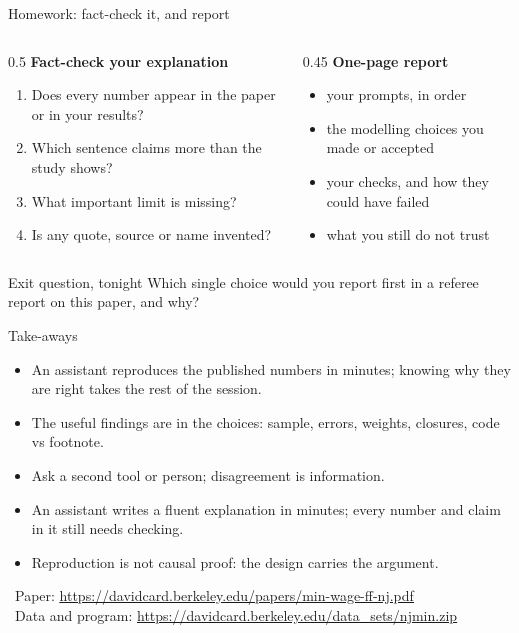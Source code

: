 \documentclass[aspectratio=169,11pt]{beamer}
\let\oldurl\url
\renewcommand{\url}[1]{{\color{linkblue}\uline{\oldurl{#1}}}}
\newcommand{\paperurl}{https://davidcard.berkeley.edu/papers/min-wage-ff-nj.pdf}
\newcommand{\dataurl}{https://davidcard.berkeley.edu/data_sets/njmin.zip}
\begin{document}
\begin{frame}{Homework: fact-check it, and report}
\begin{columns}[T]
\begin{column}{0.5\textwidth}
\textbf{Fact-check your explanation}
\begin{enumerate}
\item Does every number appear in the paper or in your results?
\item Which sentence claims more than the study shows?
\item What important limit is missing?
\item Is any quote, source or name invented?
\end{enumerate}
\end{column}
\begin{column}{0.45\textwidth}
\textbf{One-page report}
\begin{itemize}
\item your prompts, in order
\item the modelling choices you made or accepted
\item your checks, and how they could have failed
\item what you still do not trust
\end{itemize}
\end{column}
\end{columns}
\vspace{0.6em}
\begin{alertblock}{Exit question, tonight}
Which single choice would you report first in a referee report on this paper, and why?
\end{alertblock}
\end{frame}

\begin{frame}{Take-aways}
\begin{itemize}
\item An assistant reproduces the published numbers in minutes; \alert{knowing why they are right} takes the rest of the session.
\item The useful findings are in the \alert{choices}: sample, errors, weights, closures, code vs footnote.
\item Ask a \alert{second} tool or person; disagreement is information.
\item An assistant writes a fluent explanation in minutes; \alert{every number and claim} in it still needs checking.
\item Reproduction is not causal proof: the \alert{design} carries the argument.
\end{itemize}
\vspace{0.8em}
\footnotesize
\faFilePdf\ Paper: \url{\paperurl}\\
\faDatabase\ Data and program: \url{\dataurl}
\end{frame}
\end{document}
